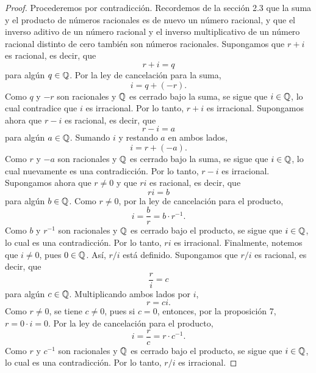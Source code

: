 \documentclass[12pt,a4paper]{article}
\begin{document}
    \begin{proof}
        Procederemos por contradicción. Recordemos de la sección 2.3 que la suma y el producto de números racionales es de nuevo un número racional, y que el inverso aditivo de un número racional y el inverso multiplicativo de un número racional distinto de cero también son números racionales. Supongamos que $r+i$ es racional, es decir, que
        \begin{equation*}
            r+i=q
        \end{equation*}
        para algún $q\in\mathbb{Q}$. Por la ley de cancelación para la suma,
        \begin{equation*}
            i=q+(-r).
        \end{equation*}
        Como $q$ y $-r$ son racionales y $\mathbb{Q}$ es cerrado bajo la suma, se sigue que $i\in\mathbb{Q}$, lo cual contradice que $i$ es irracional. Por lo tanto, $r+i$ es irracional. Supongamos ahora que $r-i$ es racional, es decir, que
        \begin{equation*}
            r-i=a
        \end{equation*}
        para algún $a\in\mathbb{Q}$. Sumando $i$ y restando $a$ en ambos lados,
        \begin{equation*}
            i=r+(-a).
        \end{equation*}
        Como $r$ y $-a$ son racionales y $\mathbb{Q}$ es cerrado bajo la suma, se sigue que $i\in\mathbb{Q}$, lo cual nuevamente es una contradicción. Por lo tanto, $r-i$ es irracional. Supongamos ahora que $r\neq0$ y que $ri$ es racional, es decir, que
        \begin{equation*}
            ri=b
        \end{equation*}
        para algún $b\in\mathbb{Q}$. Como $r\neq0$, por la ley de cancelación para el producto,
        \begin{equation*}
            i=\frac{b}{r}=b\cdot r^{-1}.
        \end{equation*}
        Como $b$ y $r^{-1}$ son racionales y $\mathbb{Q}$ es cerrado bajo el producto, se sigue que $i\in\mathbb{Q}$, lo cual es una contradicción. Por lo tanto, $ri$ es irracional. Finalmente, notemos que $i\neq0$, pues $0\in\mathbb{Q}$. Así, $r/i$ está definido. Supongamos que $r/i$ es racional, es decir, que
        \begin{equation*}
            \frac{r}{i}=c
        \end{equation*}
        para algún $c\in\mathbb{Q}$. Multiplicando ambos lados por $i$,
        \begin{equation*}
            r=ci.
        \end{equation*}
        Como $r\neq0$, se tiene $c\neq0$, pues si $c=0$, entonces, por la proposición 7, $r=0\cdot i=0$. Por la ley de cancelación para el producto,
        \begin{equation*}
            i=\frac{r}{c}=r\cdot c^{-1}.
        \end{equation*}
        Como $r$ y $c^{-1}$ son racionales y $\mathbb{Q}$ es cerrado bajo el producto, se sigue que $i\in\mathbb{Q}$, lo cual es una contradicción. Por lo tanto, $r/i$ es irracional.
    \end{proof}
\end{document}
